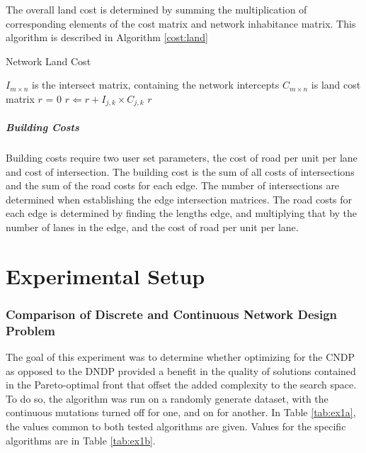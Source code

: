 \documentclass[11pt, oneside, notitlepage, final]{article}
\begin{document}
                The overall land cost is determined by summing the multiplication of corresponding elements of the cost matrix and network inhabitance matrix. This algorithm is described in Algorithm \ref{cost:land}

                \begin{algorithm}
                \caption{Network Land Cost}
                \label{cost:land}
                \begin{algorithmic}
                \STATE $I_{m \times n}$ is the intersect matrix, containing the network intercepts
                \STATE $C_{m \times n}$ is land cost matrix
                \STATE $r$ = 0
                \STATE $r \Leftarrow r + I_{j, k} \times C_{j, k}$
                \ENDFOR
                \ENDFOR
                \RETURN $r$
                \end{algorithmic}
                \end{algorithm}
                

            \subsubsection{Building Costs}
                Building costs require two user set parameters, the cost of road per unit per lane and cost of intersection. The building cost is
                the sum of all costs of intersections and the sum of the road costs for each edge. The number of intersections are determined when establishing the edge intersection matrices. The road costs for each edge is determined by finding the lengths edge, and multiplying that by the number of lanes in the edge, and the cost of road per unit per lane.


\part{Experimental Setup}
    \setcounter{section}{0}
    \section{Comparison of Discrete and Continuous Network Design Problem}
        The goal of this experiment  was to determine whether optimizing for the CNDP as opposed to the DNDP provided a benefit in the quality of solutions contained in the Pareto-optimal front that offset the added complexity to the search space. To do so, the algorithm was run on a randomly generate dataset, with the continuous mutations turned off for one, and on for another. In Table \ref{tab:ex1a}, the values common to both tested algorithms are given. Values for the specific algorithms are in Table \ref{tab:ex1b}.
 
\end{document}
